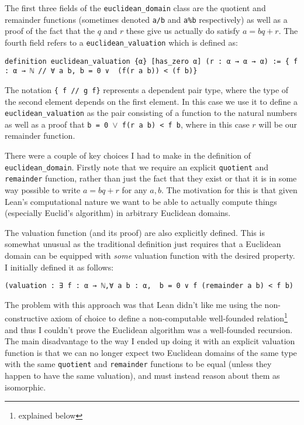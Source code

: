 \documentclass{article}
\newcommand{\ct}{\texttt}
\begin{document}
The first three fields of the \ct{euclidean\_domain} class are the quotient and remainder functions (sometimes denoted \ct{a/b} and \ct{a\%b} respectively) as well as a proof of the fact that the $q$ and $r$ these give us actually do satisfy $a=bq+r$. The fourth field refers to a \ct{euclidean\_valuation} which is defined as:
\begin{lstlisting}
definition euclidean_valuation {α} [has_zero α] (r : α → α → α) := { f : α → ℕ // ∀ a b, b = 0 ∨  (f(r a b)) < (f b)}
\end{lstlisting}

The notation \ct{\{ f // g f\}} represents a dependent pair type, where the type of the second element depends on the first element.
In this case we use it to define a \ct{euclidean\_valuation} as the pair consisting of a function to the natural numbers as well as a proof that \ct{b = 0 $\lor$ f(r a b) < f b}, where in this case $r$ will be our remainder function.

There were a couple of key choices I had to make in the definition of \ct{euclidean\_domain}.
Firstly note that we require an explicit \ct{quotient} and \ct{remainder} function, rather than just the fact that they exist or that it is in some way possible to write $a=bq+r$ for any $a,b$.
The motivation for this is that given Lean's computational nature we want to be able to actually compute things (especially Euclid's algorithm) in arbitrary Euclidean domains.

The valuation function (and its proof) are also explicitly defined. This is somewhat unusual as the traditional definition just requires that a Euclidean domain can be equipped with \textit{some} valuation function with the desired property. I initially defined it as follows:
\begin{lstlisting}
(valuation : ∃ f : α → ℕ,∀ a b : α,  b = 0 ∨ f (remainder a b) < f b)
\end{lstlisting}
The problem with this approach was that Lean didn't like me using the non-constructive axiom of choice to define a non-computable well-founded relation\footnote{explained below} and thus I couldn't prove the Euclidean algorithm was a well-founded recursion. 
The main disadvantage to the way I ended up doing it with an explicit valuation function is that we can no longer expect two Euclidean domains of the same type with the same \ct{quotient} and \ct{remainder} functions to be equal (unless they happen to have the same valuation), and must instead reason about them as isomorphic.
\end{document}
